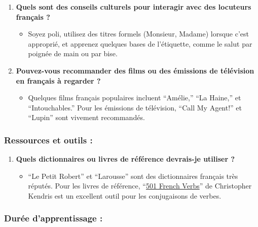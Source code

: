 \documentclass[
  16pt,
  letterpaper,
  DIV=11,
  numbers=noendperiod]{scrartcl}
\providecommand{\tightlist}{%
  \setlength{\itemsep}{0pt}\setlength{\parskip}{0pt}}\usepackage{longtable,booktabs,array}
\begin{document}
\begin{enumerate}
\def\labelenumi{\arabic{enumi}.}
\setcounter{enumi}{11}
\tightlist
\item
  \textbf{Quels sont des conseils culturels pour interagir avec des
  locuteurs français ?}

  \begin{itemize}
  \tightlist
  \item
    Soyez poli, utilisez des titres formels (Monsieur, Madame) lorsque
    c'est approprié, et apprenez quelques bases de l'étiquette, comme le
    salut par poignée de main ou par bise.
  \end{itemize}
\item
  \textbf{Pouvez-vous recommander des films ou des émissions de
  télévision en français à regarder ?}

  \begin{itemize}
  \tightlist
  \item
    Quelques films français populaires incluent ``Amélie,'' ``La
    Haine,'' et ``Intouchables.'' Pour les émissions de télévision,
    ``Call My Agent!'' et ``Lupin'' sont vivement recommandés.
  \end{itemize}
\end{enumerate}

\subsubsection{Ressources et outils :}\label{ressources-et-outils}

\begin{enumerate}
\def\labelenumi{\arabic{enumi}.}
\setcounter{enumi}{13}
\tightlist
\item
  \textbf{Quels dictionnaires ou livres de référence devrais-je utiliser
  ?}

  \begin{itemize}
  \tightlist
  \item
    ``Le Petit Robert'' et ``Larousse'' sont des dictionnaires français
    très réputés. Pour les livres de référence,
    ``\href{https://bpb-us-e1.wpmucdn.com/blogs.uoregon.edu/dist/f/8175/files/2014/06/Kendris_501_French_Verbs_Barrons-13u1653.pdf}{501
    French Verbs}'' de Christopher Kendris est un excellent outil pour
    les conjugaisons de verbes.
  \end{itemize}
\end{enumerate}

\subsubsection{Durée d'apprentissage :}\label{duruxe9e-dapprentissage}
\end{document}
